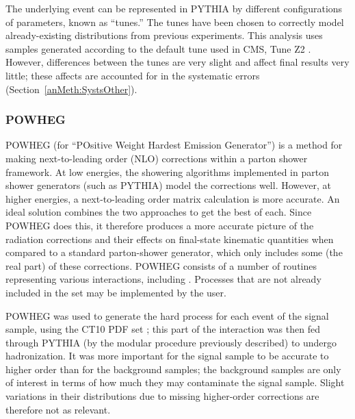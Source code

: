 
The underlying event 
can be represented in PYTHIA 
by different configurations of parameters, 
known as ``tunes.''  
The tunes have been chosen to correctly model 
already-existing distributions from previous 
experiments.  
This analysis uses samples generated 
according to the default tune used in CMS, 
Tune Z2 \cite{TuneZ2}.  
However, differences between the tunes 
are very slight and affect 
final results very little; 
these affects are accounted for 
in the systematic errors 
(Section~\ref{anMeth:SystsOther}).  

\subsubsection{POWHEG}
\label{sim:MCGensPowheg}



POWHEG (for ``POsitive Weight Hardest Emission Generator'') 
\cite{powheg} %
is a method for making next-to-leading order (NLO) 
corrections within a parton shower framework.  
At low energies, the showering algorithms implemented 
in parton shower generators (such as PYTHIA) 
model the corrections well.  
However, at higher energies, a next-to-leading order 
matrix calculation is more accurate.  
An ideal solution combines the two approaches 
to get the best of each.  
Since POWHEG does this, 
it therefore produces a more accurate picture 
of the radiation corrections and their effects 
on final-state kinematic quantities 
when compared to a standard parton-shower 
generator, %
which only includes some (the real part) 
of these corrections.  
POWHEG consists of a number of routines representing 
various %
interactions, 
including \Zee.  
Processes that are not already included 
in the set may be implemented by the user.  

POWHEG was used to generate the 
hard process for each event 
of the \Zee signal sample, 
using the CT10 PDF set \cite{CT10}; 
this part of the interaction was then 
fed through PYTHIA 
(by the modular procedure previously described) 
to undergo hadronization.  
It was more important for the signal 
sample to be accurate to higher order 
than for the background samples; 
the background samples are only of interest 
in terms of how much they may contaminate 
the signal sample.  
Slight variations in their distributions 
due to missing higher-order corrections are 
therefore not as relevant.  

